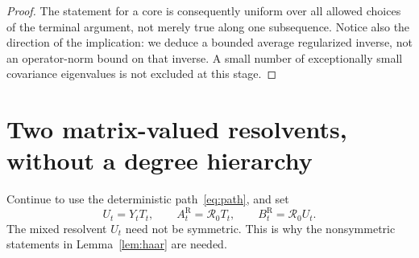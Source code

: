 \documentclass[11pt]{article}
\theoremstyle{definition}\newtheorem{definition}[theorem]{Definition}
\theoremstyle{remark}\newtheorem{remark}[theorem]{Remark}
\newcommand{\R}{\mathcal R}
\begin{document}
\begin{proof}
The statement for a core is consequently uniform over all allowed choices of the terminal argument, not merely true along one subsequence. Notice also the direction of the implication: we deduce a bounded average regularized inverse, not an operator-norm bound on that inverse. A small number of exceptionally small covariance eigenvalues is not excluded at this stage.

\end{proof}

\section{Two matrix-valued resolvents, without a degree hierarchy}\label{sec:matrix}
Continue to use the deterministic path~\eqref{eq:path}, and set
\[
 U_t=Y_tT_t,\qquad A_t^{\mathrm R}=\R_0T_t,\qquad B_t^{\mathrm R}=\R_0U_t.
\]
The mixed resolvent $U_t$ need not be symmetric. This is why the nonsymmetric statements in Lemma~\ref{lem:haar} are needed.
\end{document}
